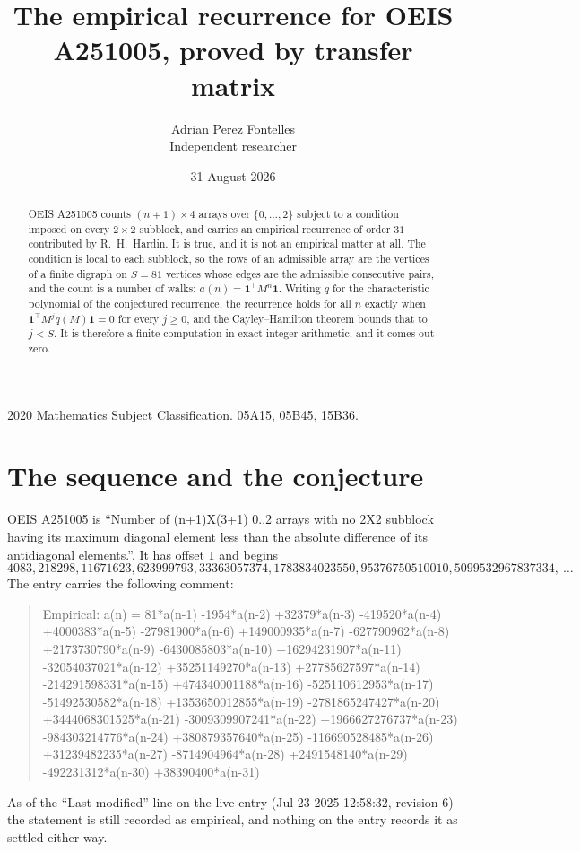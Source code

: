 \documentclass[11pt,a4paper]{article}
\title{The empirical recurrence for OEIS A251005, proved by transfer matrix}
\author{Adrian Perez Fontelles\\ \small Independent researcher}
\date{31 August 2026}
\theoremstyle{plain}
\theoremstyle{definition}
\begin{document}
\maketitle

\begin{abstract}
OEIS A251005 counts $(n+1)\times4$ arrays over $\{0,\dots,2\}$ subject to a condition imposed on
every $2\times2$ subblock, and carries an empirical recurrence of order $31$ contributed
by R.~H.~Hardin. It is true, and it is not an empirical matter at all. The condition is local
to each subblock, so the rows of an admissible array are the vertices of a finite digraph
on $S=81$ vertices whose edges are the admissible consecutive pairs, and the count is a
number of walks: $a(n)=\mathbf{1}^{\!\top}M^{n}\mathbf{1}$. Writing $q$
for the characteristic polynomial of the conjectured recurrence, the recurrence holds for all
$n$ exactly when $\mathbf{1}^{\!\top}M^{j}q(M)\mathbf{1}=0$ for every $j\ge0$, and the
Cayley--Hamilton theorem bounds that to $j<S$. It is therefore a finite computation in exact
integer arithmetic, and it comes out zero.
\end{abstract}

\noindent\small 2020 Mathematics Subject Classification. 05A15, 05B45, 15B36.\normalsize

\section{The sequence and the conjecture}

OEIS A251005 is ``Number of (n+1)X(3+1) 0..2 arrays with no 2X2 subblock having its maximum diagonal element less than the absolute difference of its antidiagonal elements.''. It has offset $1$ and begins
\[
4083, 218298, 11671623, 623999793, 33363057374, 1783834023550, 95376750510010, 5099532967837334,\ \dots
\]
The entry carries the following comment:
\begin{quote}\small
Empirical: a(n) = 81*a(n-1) -1954*a(n-2) +32379*a(n-3) -419520*a(n-4) +4000383*a(n-5) -27981900*a(n-6) +149000935*a(n-7) -627790962*a(n-8) +2173730790*a(n-9) -6430085803*a(n-10) +16294231907*a(n-11) -32054037021*a(n-12) +35251149270*a(n-13) +27785627597*a(n-14) -214291598331*a(n-15) +474340001188*a(n-16) -525110612953*a(n-17) -51492530582*a(n-18) +1353650012855*a(n-19) -2781865247427*a(n-20) +3444068301525*a(n-21) -3009309907241*a(n-22) +1966627276737*a(n-23) -984303214776*a(n-24) +380879357640*a(n-25) -116690528485*a(n-26) +31239482235*a(n-27) -8714904964*a(n-28) +2491548140*a(n-29) -492231312*a(n-30) +38390400*a(n-31)
\end{quote}
As of the ``Last modified'' line on the live entry (Jul 23 2025 12:58:32, revision 6) the statement is
still recorded as empirical, and nothing on the entry records it as settled either way.
\end{document}
